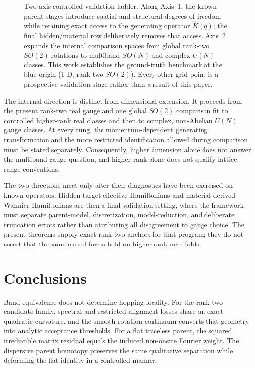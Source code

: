 \documentclass[aps,prb,reprint,amsmath,amssymb,longbibliography,floatfix]{revtex4-2}
\makeatletter
\def\label#1{\@bsphack
  \begingroup
  \UseHookWithArguments{label}{1}{#1}%
  \protected@write\@auxout{}%
    {\string\newlabel{#1}{{\@currentlabel}{\thepage}{\@currentlabelname}%
      {\@currentHref}{\@kernel@reserved@label@data}}}%
  \endgroup
  \@esphack}
\makeatother
\begin{document}
\begin{figure}[t]
\caption{Two-axis controlled validation ladder. Along Axis~1, the known-parent stages
introduce spatial and structural degrees of freedom while retaining exact access to the
generating operator $\widehat K(q)$; the final hidden/material row deliberately removes
that access. Axis~2 expands the internal comparison spaces from global rank-two $SO(2)$
rotations to multiband $SO(N)$ and complex $U(N)$ classes. This work establishes the
ground-truth benchmark at the blue origin (1-D, rank-two $SO(2)$). Every other grid point
is a prospective validation stage rather than a result of this paper.}
\label{fig:validation-ladder}
\end{figure}

The internal direction is distinct from dimensional extension. It proceeds from the
present rank-two real gauge and one global $SO(2)$ comparison fit to controlled
higher-rank real classes and then to complex, non-Abelian $U(N)$ gauge classes. At every
rung, the momentum-dependent generating transformation and the more restricted
identification allowed during comparison must be stated separately. Consequently,
higher dimension alone does not answer the multiband-gauge question, and higher rank
alone does not qualify lattice range conventions.

The two directions meet only after their diagnostics have been exercised on known
operators. Hidden-target effective Hamiltonians and material-derived Wannier
Hamiltonians are then a final validation setting, where the framework must separate
parent-model, discretization, model-reduction, and deliberate truncation errors rather
than attributing all disagreement to gauge choice. The present theorems supply exact
rank-two anchors for that program; they do not assert that the same closed forms hold on
higher-rank manifolds.

\clearpage
\section{Conclusions}

Band equivalence does not determine hopping locality. For the rank-two candidate family,
spectral and restricted-alignment losses share an exact quadratic curvature, and the
smooth rotation continuum converts that geometry into analytic acceptance thresholds.
For a flat traceless parent, the squared irreducible matrix residual equals the induced
non-onsite Fourier weight. The dispersive parent homotopy preserves the same qualitative
separation while deforming the flat identity in a controlled manner.
\end{document}
